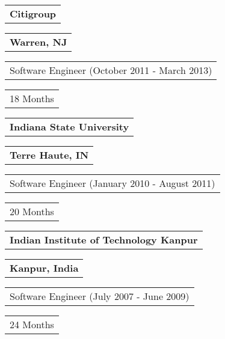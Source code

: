 \documentclass[letterpaper,11pt]{article}
\begin{document}

    \vspace{0.25cm}
    \noindent
    \begin{tabular}[t]{@{}l}
    \textbf{Citigroup}
    \end{tabular}
    \hfill
    \begin{tabular}[t]{l@{}}
    \textbf{Warren, NJ}
    \end{tabular}
    \noindent\newline
    \begin{tabular}[t]{@{}l}
    Software Engineer (October 2011 - March 2013)
    \end{tabular}
    \hfill
    \begin{tabular}[t]{l@{}}
    18 Months
    \end{tabular}


    \vspace{0.25cm}
    \noindent
    \begin{tabular}[t]{@{}l}
    \textbf{Indiana State University}
    \end{tabular}
    \hfill
    \begin{tabular}[t]{l@{}}
    \textbf{Terre Haute, IN}
    \end{tabular}
    \noindent\newline
    \begin{tabular}[t]{@{}l}
    Software Engineer (January 2010 - August 2011)
    \end{tabular}
    \hfill
    \begin{tabular}[t]{l@{}}
    20 Months
    \end{tabular}


    \vspace{0.25cm}
    \noindent
    \begin{tabular}[t]{@{}l}
    \textbf{Indian Institute of Technology Kanpur}
    \end{tabular}
    \hfill
    \begin{tabular}[t]{l@{}}
    \textbf{Kanpur, India}
    \end{tabular}
    \noindent\newline
    \begin{tabular}[t]{@{}l}
    Software Engineer (July 2007 - June 2009)
    \end{tabular}
    \hfill
    \begin{tabular}[t]{l@{}}
    24 Months
    \end{tabular}
\end{document}
